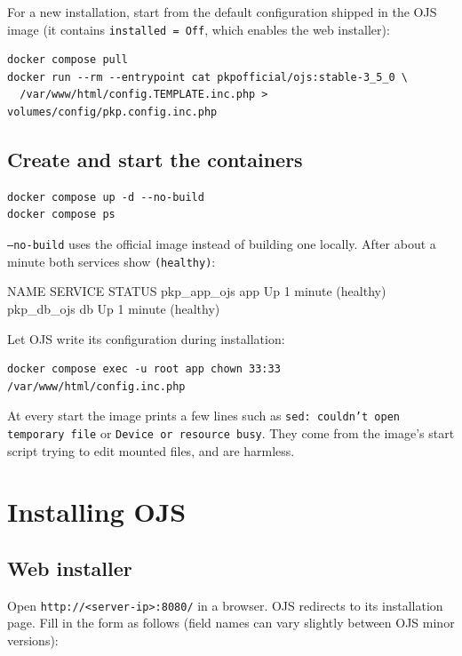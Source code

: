 \documentclass[11pt,a4paper]{report}
\newcommand{\code}[1]{\texttt{\small #1}}
\begin{document}
For a new installation, start from the default configuration shipped in the OJS image
(it contains \code{installed = Off}, which enables the web installer):
\begin{lstlisting}
docker compose pull
docker run --rm --entrypoint cat pkpofficial/ojs:stable-3_5_0 \
  /var/www/html/config.TEMPLATE.inc.php > volumes/config/pkp.config.inc.php
\end{lstlisting}

\section{Create and start the containers}
\begin{lstlisting}
docker compose up -d --no-build
docker compose ps
\end{lstlisting}
\code{--no-build} uses the official image instead of building one locally. After about a
minute both services show \code{(healthy)}:
\begin{termout}
NAME          SERVICE   STATUS
pkp_app_ojs   app       Up 1 minute (healthy)
pkp_db_ojs    db        Up 1 minute (healthy)
\end{termout}

Let OJS write its configuration during installation:
\begin{lstlisting}
docker compose exec -u root app chown 33:33 /var/www/html/config.inc.php
\end{lstlisting}

\begin{note}
At every start the image prints a few lines such as \code{sed: couldn't open temporary file}
or \code{Device or resource busy}. They come from the image's start script trying to edit
mounted files, and are harmless.
\end{note}

\chapter{Installing OJS}\label{ch:install}

\section{Web installer}
Open \code{http://<server-ip>:8080/} in a browser. OJS redirects to its installation page.
Fill in the form as follows (field names can vary slightly between OJS minor versions):
\end{document}
